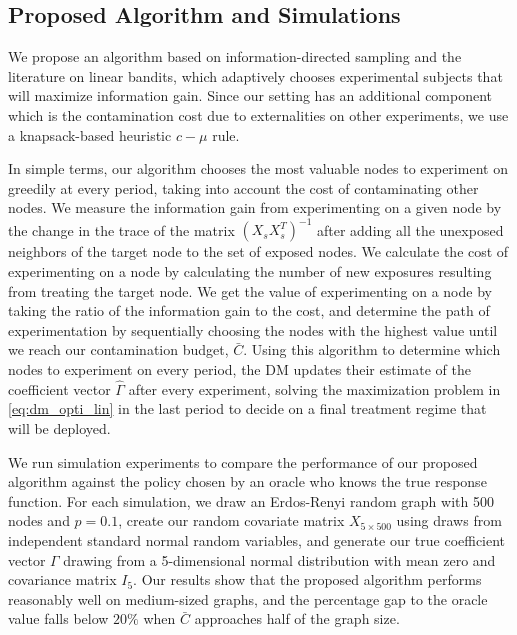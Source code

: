 \documentclass[11pt,a4paper]{article}
\begin{document}
\subsection{Proposed Algorithm and Simulations}

We propose an algorithm based on information-directed sampling and the literature on linear bandits, which adaptively chooses experimental subjects that will maximize information gain. Since our setting has an additional component which is the contamination cost due to externalities on other experiments, we use a knapsack-based heuristic $c-\mu$ rule.

In simple terms, our algorithm chooses the most valuable nodes to experiment on greedily at every period, taking into account the cost of contaminating other nodes. We measure the information gain from experimenting on a given node by the change in the trace of the matrix $( X_s X_s^T)^{-1}$ after adding all the unexposed neighbors of the target node to the set of exposed nodes. We calculate the cost of experimenting on a node by calculating the number of new exposures resulting from treating the target node. We get the value of experimenting on a node by taking the ratio of the information gain to the cost, and determine the path of experimentation by sequentially choosing the nodes with the highest value until we reach our contamination budget, $\bar{C}$. Using this algorithm to determine which nodes to experiment on every period, the DM updates their estimate of the coefficient vector $\hat \Gamma$ after every experiment, solving the maximization problem in \eqref{eq:dm_opti_lin} in the last period to decide on a final treatment regime that will be deployed.

We run simulation experiments to compare the performance of our proposed algorithm against the policy chosen by an oracle who knows the true response function. For each simulation, we draw an Erdos-Renyi random graph with 500 nodes and $p =0.1$, create our random covariate matrix $X_{5 \times 500}$ using draws from independent standard normal random variables, and generate our true coefficient vector $\Gamma$ drawing from a 5-dimensional normal distribution with mean zero and covariance matrix $I_5$. Our results show that the proposed algorithm performs reasonably well on medium-sized graphs, and the percentage gap to the oracle value falls below $20 \%$ when $\bar{C}$ approaches half of the graph size.
\end{document}
